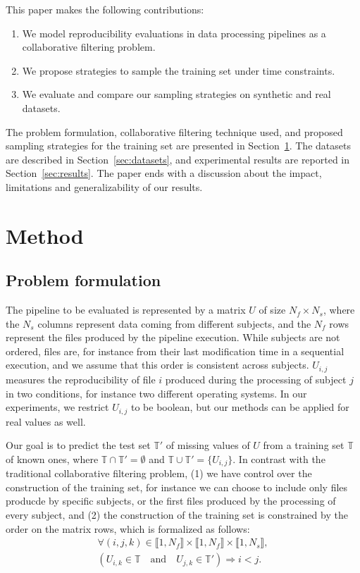 \documentclass[10pt, conference, compsocconf]{IEEEtran}
\begin{document}
This paper makes the following contributions:
\begin{enumerate}
\item We model reproducibility evaluations in data processing pipelines as a collaborative filtering problem.
\item We propose strategies to sample the training set under time constraints.
\item We evaluate and compare our sampling strategies on synthetic and real datasets.
\end{enumerate}
The problem formulation, collaborative filtering technique used, and 
proposed sampling strategies for the training set are presented in 
Section~\ref{sec:methods}. The datasets are described in 
Section~\ref{sec:datasets}, and experimental results are reported in 
Section~\ref{sec:results}.
The paper ends with a discussion about the impact, limitations and 
generalizability of our results.

\section{Method}
\label{sec:methods}
\subsection{Problem formulation}

The pipeline to be evaluated is represented by a matrix $U$ of size 
$N_f \times N_s$, where the $N_s$ columns represent data coming from 
different subjects, and the $N_f$ rows represent the files produced by 
the pipeline execution. While subjects are not ordered, files are, for 
instance from their last modification time in a sequential execution, 
and we assume that this order is consistent across subjects. $U_{i, j}$ 
measures the reproducibility of file $i$ produced during the processing 
of subject $j$ in two conditions, for instance two different 
operating systems. In our experiments, we restrict $U_{i,j}$ to be 
boolean, but our methods can be applied for real values as well. 

Our goal is to predict the test set $\mathbb{T'}$ of missing values of 
$U$ from a training set $\mathbb{T}$ of known ones, where $\mathbb{T} 
\cap \mathbb{T'} = \emptyset$ and $\mathbb{T} \cup \mathbb{T'} = 
\{U_{i,j}\}$. In contrast with the traditional collaborative filtering 
problem, (1) we have control over the construction of the training set, 
for instance we can choose to include only files producde by specific 
subjects, or the first files produced by the processing of every 
subject, and (2) the construction of the training set is constrained by 
the 
order on the matrix rows, which is formalized as follows: 
\begin{equation}
\begin{array}{l}
\forall (i, j, k) \in \llbracket 1, N_f \rrbracket \times \llbracket 1, N_f \rrbracket \times \llbracket 1, N_s \rrbracket, \\
 \left( U_{i,k} \in \mathbb{T} \quad \mathrm{and} \quad U_{j,k} \in \mathbb{T'} \right) \Rightarrow i < j. \label{eq:time}
 \end{array}
\end{equation}
\end{document}
